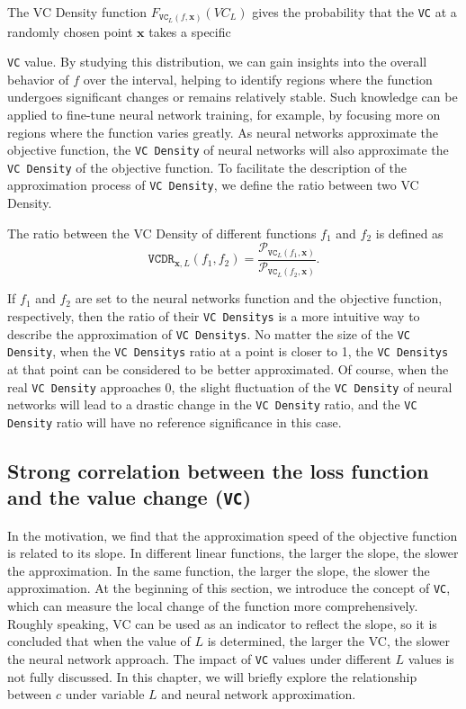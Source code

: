 \documentclass[final]{siamart220329}
\newtheorem{theoretical insights}{Theoretical insights}
\newtheorem{practical takeaway}{Practical takeaway}
\begin{document}
The {\ttfamily VC Density} function $F_{\texttt{VC}_{L}(f,{\bm x})}(VC_L)$ gives the probability that the \texttt{VC} at a randomly chosen point \({\bm x}\) takes a specific {\texttt{VC} value. By studying this distribution, we can gain insights into the overall behavior of \(f\) over the interval, helping to identify regions where the function undergoes significant changes or remains relatively stable. Such knowledge can be applied to fine-tune neural network training, for example, by focusing more on regions where the function varies greatly.
As neural networks approximate the objective function, the \texttt{VC Density} of neural networks will also approximate the \texttt{VC Density} of the objective function. To facilitate the description of the approximation process of \texttt{VC Density}, we define the ratio between two {\ttfamily VC Density}. 


\begin{definition}
The ratio between the {\ttfamily VC Density} of different functions \(f_1\) and \(f_2\) is defined as  
    \[\texttt{VCDR}_{{\bm x},L}(f_1,f_2)= 
\frac{{\mathcal P}_{\texttt{VC}_{L}(f_1,{\bm x})}}{{\mathcal P}_{\texttt{VC}_{L}(f_2,{\bm x})}}. 
\]
\end{definition}

If $f_1$ and $f_2$ are set to the neural networks function and the objective function, respectively, then the ratio of their \texttt{VC Densitys} is a more intuitive way to describe the approximation of \texttt{VC Densitys}. No matter the size of the \texttt{VC Density}, when the \texttt{VC Densitys} ratio at a point is closer to 1, the \texttt{VC Densitys} at that point can be considered to be better approximated. Of course, when the real \texttt{VC Density} approaches 0, the slight fluctuation of the \texttt{VC Density} of neural networks will lead to a drastic change in the \texttt{VC Density} ratio, and the \texttt{VC Density} ratio will have no reference significance in this case.



\subsection{Strong correlation between the loss function and the value change (\texttt{VC})}\label{sec3.2}

{In the motivation, we find that the approximation speed of the objective function is related to its slope. In different linear functions, the larger the slope, the slower the approximation. In the same function, the larger the slope, the slower the approximation. At the beginning of this section, we introduce the concept of \texttt{VC}, which can measure the local change of the function more comprehensively. Roughly speaking, {\ttfamily VC} can be used as an indicator to reflect the slope, so it is concluded that when the value of \(L\) is determined, the larger the {\ttfamily VC}, the slower the neural network approach. The impact of \texttt{VC} values under different $L$ values is not fully discussed. In this chapter, we will briefly explore the relationship between \(c\) under variable $L$ and neural network approximation.} 


}
\end{document}
